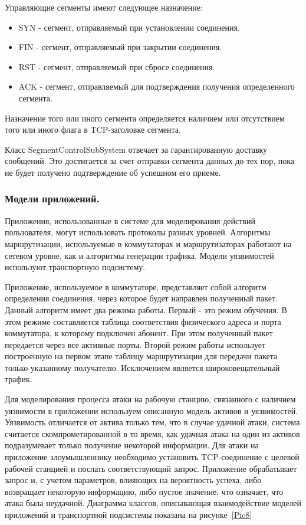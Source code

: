 \documentclass[12pt]{report}
\begin{document}
    Управляющие сегменты имеют следующее назначение:
    
    \begin{itemize}
        \item SYN - сегмент, отправляемый при установлении соединения. 
        \item FIN - сегмент, отправляемый при закрытии соединения.
        \item RST - сегмент, отправляемый при сбросе соединения.
        \item ACK - сегмент, отправляемый для подтверждения получения определенного сегмента.
    \end{itemize}
    
    Назначение того или иного сегмента определяется наличием или отсутствием того или иного флага в TCP-заголовке сегмента. 
    
    Класс SegmentControlSubSystem отвечает за гарантированную доставку сообщений. Это достигается за счет отправки сегмента данных до тех пор, пока не будет получено подтверждение об успешном его приеме. 

    \subsubsection{Модели приложений.}
    
    Приложения, использованные в системе для моделирования действий пользователя, могут использовать протоколы разных уровней. Алгоритмы маршрутизации, используемые в коммутаторах и маршрутизаторах работают на сетевом уровне, как и алгоритмы генерации трафика. Модели уязвимостей используют транспортную подсистему. 
    
    Приложение, используемое в коммутаторе, представляет собой алгоритм определения соединения, через которое будет направлен полученный пакет. Данный алгоритм имеет два режима работы. Первый - это режим обучения. В этом режиме составляется таблица соответствия физического адреса и порта коммутатора, к которому подключен абонент. При этом полученный пакет передается через все активные порты. Второй режим работы использует построенную на первом этапе таблицу маршрутизации для передачи пакета только указанному получателю. Исключением является широковещательный трафик. 
    
    
    
    
    Для моделирования процесса атаки на рабочую станцию, связанного с наличием уязвимости в приложении используем описанную модель активов и уязвимостей. Уязвимость отличается от актива только тем, что в случае удачной атаки, система считается скомпрометированной в то время, как удачная атака на один из активов подразумевает только получение некоторой информации. Для атаки на приложение злоумышленнику необходимо установить TCP-соединение с целевой рабочей станцией и послать соответствующий запрос. Приложение обрабатывает запрос и, с учетом параметров, влияющих на вероятность успеха, либо возвращает некоторую информацию, либо пустое значение, что означает, что атака была неудачной. Диаграмма классов, описывающая взаимодействие моделей приложений и транспортной подсистемы показана на рисунке~\ref{Pic8}
\end{document}
